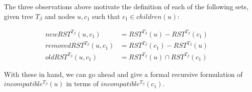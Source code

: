 \documentclass{article}
\newcommand{\TB}{T_\beta}
\begin{document}
    The three observations above motivate the definition of each of the following sets, given tree $\TB$ and nodes $u, c_1$ such that $c_1 \in children(u)$:

    \begin{align*}
        newRST^{\TB}(u, c_1) &= RST^{\TB}(u) - RST^{\TB}(c_1)\\[0.5em]
        removedRST^{\TB}(u, c_1) &= RST^{\TB}(c_1) - RST^{\TB}(u)\\[0.5em]
        oldRST^{\TB}(u, c_1) &= RST^{\TB}(u) \cap RST^{\TB}(c_1)
    \end{align*}

    With these in hand, we can go ahead and give a formal recursive formulation of $incompatible^{\TB}(u)$ in terms of $incompatible^{\TB}(c_1)$.
    \newline
\end{document}
